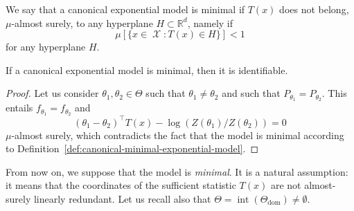 \documentclass[
	fontsize=11pt, %
	twoside=false, %
	numbers=noenddot, %
]{kaobook}
\DeclareMathOperator{\cX}{{\mathcal X}}
\DeclareMathOperator{\inte}{int}
\DeclareMathOperator{\dom}{dom}
\newcommand{\R}{\mathbb R}
\begin{document}
\begin{definition}
	\label{def:canonical-minimal-exponential-model}
	We say that a canonical exponential model is minimal if $T(x)$ does not belong, $\mu$-almost surely, to any hyperplane $H \subset \R^d$, namely if 
	\begin{equation*}
		\mu[ \{ x \in \cX : T(x) \in H \}] < 1
	\end{equation*}
	for any hyperplane $H$.
\end{definition}

\begin{proposition}
	If a canonical exponential model is minimal, then it is identifiable.
\end{proposition}

\begin{proof}
Let us consider $\theta_1, \theta_2 \in \Theta$ such that $\theta_1 \neq \theta_2$ and such that $P_{\theta_1} = P_{\theta_2}$.
This entails $f_{\theta_1} = f_{\theta_2}$ and
\begin{equation*}
	(\theta_1 - \theta_2)^\top T(x) - \log (Z(\theta_1) / Z(\theta_2)) = 0
\end{equation*}
 $\mu$-almost surely, which contradicts the fact that the model is minimal according to Definition~\ref{def:canonical-minimal-exponential-model}. \qedhere
\end{proof}

From now on, we suppose that the model is \emph{minimal}.
It is a natural assumption: it means that the coordinates of the sufficient statistic $T(x)$ are not almost-surely linearly redundant.
Let us recall also that $\Theta = \inte(\Theta_{\dom}) \neq \emptyset$.
\end{document}
